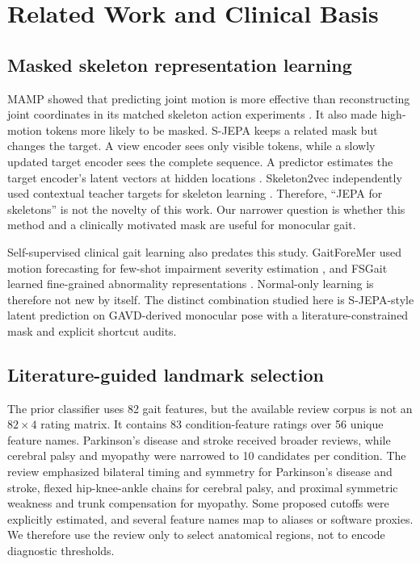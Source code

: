 \documentclass[conference]{IEEEtran}
\begin{document}
\section{Related Work and Clinical Basis}
\subsection{Masked skeleton representation learning}
MAMP showed that predicting joint motion is more effective than reconstructing joint coordinates in its matched skeleton action experiments \cite{mao2023mamp}. It also made high-motion tokens more likely to be masked. S-JEPA keeps a related mask but changes the target. A view encoder sees only visible tokens, while a slowly updated target encoder sees the complete sequence. A predictor estimates the target encoder's latent vectors at hidden locations \cite{abdelfattah2024sjepa}. Skeleton2vec independently used contextual teacher targets for skeleton learning \cite{xu2024skeleton2vec}. Therefore, ``JEPA for skeletons'' is not the novelty of this work. Our narrower question is whether this method and a clinically motivated mask are useful for monocular gait.

Self-supervised clinical gait learning also predates this study. GaitForeMer used motion forecasting for few-shot impairment severity estimation \cite{endo2022gaitforemer}, and FSGait learned fine-grained abnormality representations \cite{duan2024fsgait}. Normal-only learning is therefore not new by itself. The distinct combination studied here is S-JEPA-style latent prediction on GAVD-derived monocular pose with a literature-constrained mask and explicit shortcut audits.

\subsection{Literature-guided landmark selection}
The prior classifier uses 82 gait features, but the available review corpus is not an $82 \times 4$ rating matrix. It contains 83 condition-feature ratings over 56 unique feature names. Parkinson's disease and stroke received broader reviews, while cerebral palsy and myopathy were narrowed to 10 candidates per condition. The review emphasized bilateral timing and symmetry for Parkinson's disease and stroke, flexed hip-knee-ankle chains for cerebral palsy, and proximal symmetric weakness and trunk compensation for myopathy. Some proposed cutoffs were explicitly estimated, and several feature names map to aliases or software proxies. We therefore use the review only to select anatomical regions, not to encode diagnostic thresholds.
\end{document}
